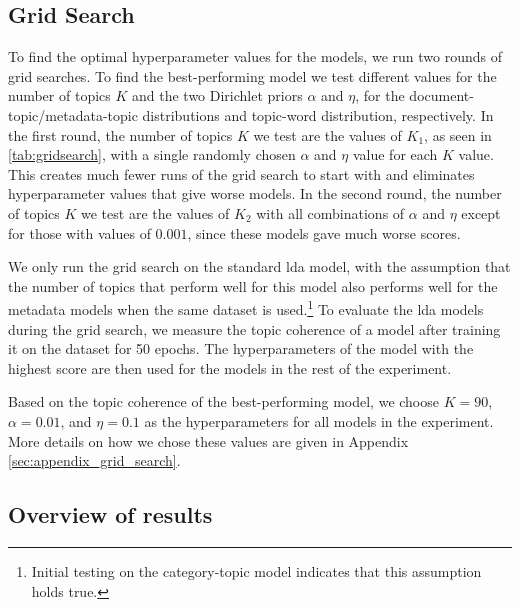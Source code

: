 \subsection{Grid Search}\label{sec:experiment_gridsearch}
To find the optimal hyperparameter values for the models, we run two rounds of grid searches.
To find the best-performing model we test different values for the number of topics $K$ and the two Dirichlet priors $\alpha$ and $\eta$, for the document-topic/metadata-topic distributions and topic-word distribution, respectively.
In the first round, the number of topics $K$ we test are the values of $K_1$, as seen in \autoref{tab:gridsearch}, with a single randomly chosen $\alpha$ and $\eta$ value for each $K$ value.
This creates much fewer runs of the grid search to start with and eliminates hyperparameter values that give worse models.
In the second round, the number of topics $K$ we test are the values of $K_2$ with all combinations of $\alpha$ and $\eta$ except for those with values of $0.001$, since these models gave much worse scores.

We only run the grid search on the standard \gls{lda} model, with the assumption that the number of topics that perform well for this model also performs well for the metadata models when the same dataset is used.\footnote{Initial testing on the category-topic model indicates that this assumption holds true.}
To evaluate the \gls{lda} models during the grid search, we measure the topic coherence of a model after training it on the dataset for 50 epochs.
The hyperparameters of the model with the highest score are then used for the models in the rest of the experiment.

Based on the topic coherence of the best-performing model, we choose $K = 90$, $\alpha = 0.01$, and $\eta = 0.1$ as the hyperparameters for all models in the experiment.
More details on how we chose these values are given in Appendix \autoref{sec:appendix_grid_search}.



\subsection{Overview of results}\label{sec:results}



